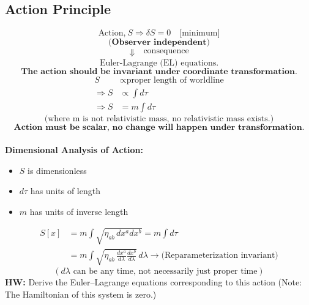 \documentclass[14pt]{article} %
\begin{document}
\subsection*{Action Principle}
$$ \text{Action,}~ S \Rightarrow \delta S = 0 \quad \text{[minimum]} $$
$$ \textbf{(Observer independent)} $$
\begin{align*}
\Downarrow \quad \text{consequence}
\end{align*}
$$\text{Euler-Lagrange (EL) equations.}$$
$$ \textbf{The action should be invariant under coordinate transformation.} $$
\begin{align*}
    S &\propto \text{proper length of worldline} \\
    \Rightarrow S &\propto \int d\tau \\
    \Rightarrow S &= m \int d\tau
\end{align*}
$$ \text{(where m is not relativistic mass, no relativistic mass exists.)} $$
$$\textbf{Action must be scalar, no change will happen under transformation.}$$
\\
\textbf{Dimensional Analysis of Action:}
\begin{itemize}
    \item $S$ is dimensionless
    \item $d\tau$ has units of length
    \item $m$ has units of inverse length
\end{itemize}
\begin{align*}
    S[x] &= m \int \sqrt{ \eta_{ab} \, dx^a dx^b }=m \int d \tau \\
    &= m \int \sqrt{ \eta_{ab} \, \frac{dx^a}{d\lambda} \frac{dx^b}{d\lambda} } \, d\lambda 
\rightarrow \text{(Reparameterization invariant)}
\end{align*}
$$(d\lambda\text{ can be any time, not necessarily just proper time})$$
\noindent
\textbf{HW:} \quad Derive the Euler–Lagrange equations corresponding to this action (Note: The Hamiltonian of this system is zero.)
\end{document}
